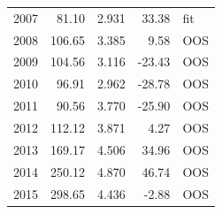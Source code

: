 \begin{longtable}{rrrrl}
2007 & 81.10 & 2.931 & 33.38 & fit \\
2008 & 106.65 & 3.385 & 9.58 & OOS \\
2009 & 104.56 & 3.116 & -23.43 & OOS \\
2010 & 96.91 & 2.962 & -28.78 & OOS \\
2011 & 90.56 & 3.770 & -25.90 & OOS \\
2012 & 112.12 & 3.871 & 4.27 & OOS \\
2013 & 169.17 & 4.506 & 34.96 & OOS \\
2014 & 250.12 & 4.870 & 46.74 & OOS \\
2015 & 298.65 & 4.436 & -2.88 & OOS \\
\end{longtable}
\endgroup
